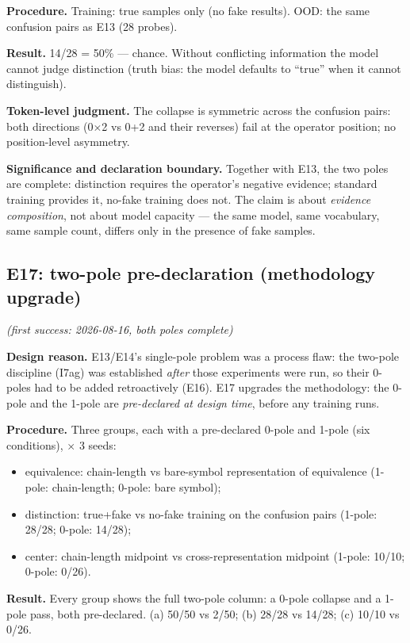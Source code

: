 \documentclass[sigplan,10pt,anonymous,review]{acmart}
\begin{document}
\textbf{Procedure.} Training: true samples only (no fake results). OOD:
the same confusion pairs as E13 (28 probes).

\textbf{Result.} 14/28 = 50\% --- chance. Without conflicting information
the model cannot judge distinction (truth bias: the model defaults to
``true'' when it cannot distinguish).

\textbf{Token-level judgment.} The collapse is symmetric across the
confusion pairs: both directions (0$\times$2 vs 0+2 and their reverses)
fail at the operator position; no position-level asymmetry.

\textbf{Significance and declaration boundary.} Together with E13, the
two poles are complete: distinction requires the operator's negative
evidence; standard training provides it, no-fake training does not. The
claim is about \emph{evidence composition}, not about model capacity ---
the same model, same vocabulary, same sample count, differs only in the
presence of fake samples.

\subsection{E17: two-pole pre-declaration (methodology upgrade)}\hfill\textit{(first success: 2026-08-16, both poles complete)}

\textbf{Design reason.} E13/E14's single-pole problem was a process flaw:
the two-pole discipline (I7ag) was established \emph{after} those
experiments were run, so their 0-poles had to be added retroactively
(E16). E17 upgrades the methodology: the 0-pole and the 1-pole are
\emph{pre-declared at design time}, before any training runs.

\textbf{Procedure.} Three groups, each with a pre-declared 0-pole and
1-pole (six conditions), $\times$ 3 seeds:
\begin{itemize}
\item[a] equivalence: chain-length vs bare-symbol representation of
equivalence (1-pole: chain-length; 0-pole: bare symbol);
\item[b] distinction: true+fake vs no-fake training on the confusion pairs
(1-pole: 28/28; 0-pole: 14/28);
\item[c] center: chain-length midpoint vs cross-representation midpoint
(1-pole: 10/10; 0-pole: 0/26).
\end{itemize}

\textbf{Result.} Every group shows the full two-pole column: a 0-pole
collapse and a 1-pole pass, both pre-declared. (a) 50/50 vs 2/50; (b)
28/28 vs 14/28; (c) 10/10 vs 0/26.
\end{document}
